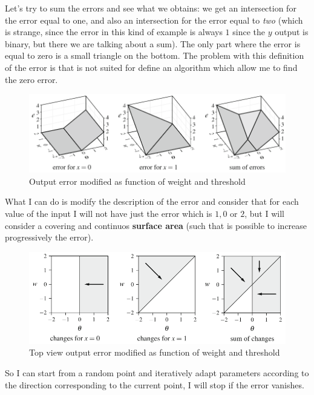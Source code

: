 \documentclass{article}
\begin{document}
Let's try to sum the errors and see what we obtains: we get an intersection for the error
equal to one, and also an intersection for the error equal to \textit{two} (which is strange,
since the error in this kind of example is always $1$ since the $y$ output is binary, but there
we are talking about a sum).
\newline\newline
The only part where the error is equal to zero is a small triangle on the bottom. The problem
with this definition of the error is that is not suited for define an algorithm which allow
me to find the zero error.
\begin{figure}[H]
    \includegraphics[scale=0.5]{images/desc_2_of_error.png}
    \centering
    \caption{Output error modified as function of weight and threshold}
\end{figure}
What I can do is modify the description of the error and consider that for each value
of the input I will not have just the error which is $1,0$ or $2$, but I will consider
a covering and continuos \textbf{surface area} (such that is possible to increase progressively
the error).
\begin{figure}[H]
    \includegraphics[scale=0.6]{images/desc_2_of_error_topview.png}
    \centering
    \caption{Top view output error modified as function of weight and threshold}
\end{figure}
So I can start from a random point and iteratively adapt parameters according to the direction
corresponding to the current point, I will stop if the error vanishes.
\newline\newline
\end{document}
